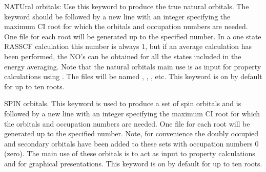 \begin{keywordlist}
NATUral orbitals:
Use this keyword to produce the true natural orbitals. The keyword
should be followed by a new line with an integer specifying the maximum
CI root for which the orbitals and occupation numbers are needed.
One file for each root will be generated up to the specified number.
In a one state RASSCF calculation this number is always 1, but if an average
calculation has been performed, the NO's can be obtained for all the states
included in the energy averaging. Note that the natural orbitals main
use is as input for property calculations using .
The files will be named , , , etc.
This keyword is on by default for up to ten roots.

SPIN orbitals.
This keyword is used to produce a set of spin orbitals and is
followed by a new line with an integer specifying the maximum CI root
for which the orbitals
and occupation numbers are needed. One file for each root will be
generated up to the specified number. Note, for convenience the
doubly occupied and secondary orbitals have been added to these
sets with occupation numbers 0 (zero). The main use of these orbitals
is to act as input to property calculations and for graphical
presentations.
This keyword is on by default for up to ten roots.


\end{keywordlist}
